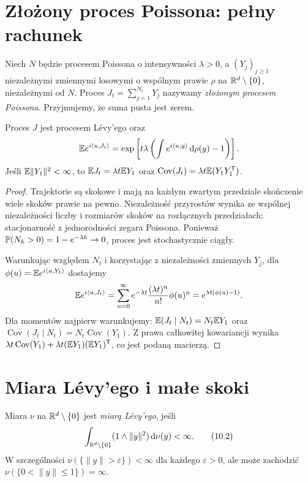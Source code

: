 \section{Złożony proces Poissona: pełny rachunek}

\begin{definicja}
Niech $N$ będzie procesem Poissona o intensywności
$\lambda>0$, a $(Y_j)_{j\ge1}$ niezależnymi zmiennymi
losowymi o wspólnym prawie $\rho$ na $\mathbb{R}^d\setminus\{0\}$,
niezależnymi od $N$. Proces
$J_t=\sum_{j=1}^{N_t}Y_j$ nazywamy \emph{złożonym
procesem Poissona}. Przyjmujemy, że suma pusta jest zerem.
\end{definicja}

\begin{twierdzenie}
\label{th:cpp}
Proces $J$ jest procesem Lévy'ego oraz
\[
\mathbb{E} e^{i\langle u,J_t\rangle}
=\exp\left[t\lambda\left(\int e^{i\langle u,y\rangle}
\,\mathrm{d}\rho(y)-1\right)\right].
\]
Jeśli $\mathbb{E}\|Y_1\|^2<\infty$, to
$\mathbb{E} J_t=\lambda t\mathbb{E} Y_1$ oraz
$\operatorname{Cov}(J_t)=\lambda t\mathbb{E}(Y_1Y_1^{\mathsf T})$.
\end{twierdzenie}
\begin{proof}
Trajektorie są skokowe i mają na każdym zwartym przedziale
skończenie wiele skoków prawie na pewno.
Niezależność przyrostów wynika ze wspólnej niezależności
liczby i rozmiarów skoków na rozłącznych przedziałach;
stacjonarność z jednorodności zegara Poissona.
Ponieważ $\mathbb{P}(N_h>0)=1-e^{-\lambda h}\to0$,
proces jest stochastycznie ciągły.

Warunkując względem $N_t$ i korzystając z niezależności
zmiennych $Y_j$, dla
$\phi(u)=\mathbb{E} e^{i\langle u,Y_1\rangle}$ dostajemy
\[
\mathbb{E} e^{i\langle u,J_t\rangle}
=\sum_{n=0}^\infty e^{-\lambda t}
\frac{(\lambda t)^n}{n!}\phi(u)^n
=e^{\lambda t(\phi(u)-1)}.
\]
Dla momentów najpierw warunkujemy:
$\mathbb{E}(J_t\mid N_t)=N_t\mathbb{E} Y_1$ oraz
$\operatorname{Cov}(J_t\mid N_t)=N_t\operatorname{Cov}(Y_1)$.
Z prawa całkowitej kowariancji wynika
$\lambda t\operatorname{Cov}(Y_1)+
\lambda t(\mathbb{E} Y_1)(\mathbb{E} Y_1)^{\mathsf T}$,
co jest podaną macierzą.
\end{proof}

\section{Miara Lévy'ego i małe skoki}

\begin{definicja}
Miara $\nu$ na $\mathbb{R}^d\setminus\{0\}$ jest
\emph{miarą Lévy'ego}, jeśli
\[
\int_{\mathbb{R}^d\setminus\{0\}}(1\wedge\|y\|^2)\,\mathrm{d}\nu(y)<\infty.
\tag{10.2}\label{eq:levy-measure}
\]
W szczególności $\nu(\{\|y\|>\varepsilon\})<\infty$
dla każdego $\varepsilon>0$, ale może zachodzić
$\nu(\{0<\|y\|\le1\})=\infty$.
\end{definicja}

